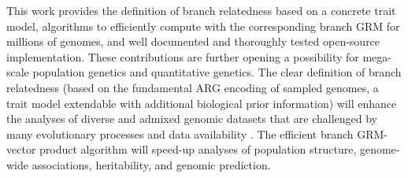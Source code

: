 This work provides the definition of branch relatedness based on a concrete trait model,
algorithms to efficiently compute with the corresponding branch GRM for millions of genomes, and
well documented and thoroughly tested open-source \tskit{} implementation.
%
These contributions are further opening a possibility for mega-scale population genetics and
quantitative genetics.
%
The clear definition of branch relatedness
(based on the fundamental ARG encoding of sampled genomes, a trait model
extendable with additional biological prior information)
will enhance the analyses of diverse and admixed genomic datasets
that are challenged by many evolutionary processes and data availability
\citep[e.g.][]{MacLeod2014Effects, Martin2017Human, durvasula2021negative,
wang2022challenges, yair2022population, RosFreixedes2022Genomic}.
%
The efficient branch GRM-vector product algorithm will speed-up
analyses of population structure, genome-wide associations,
heritability, and genomic prediction.